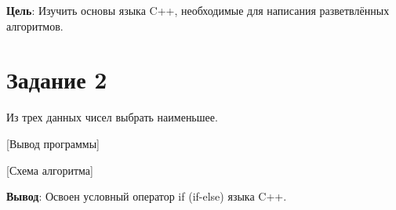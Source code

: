 \documentclass[variant=labwork]{bsuir}
\begin{document}
\textbf{Цель}: Изучить основы языка C++, необходимые для написания разветвлённых
алгоритмов.

\section*{Задание 2}

Из трех данных чисел выбрать наименьшее.


[Вывод программы]

[Схема алгоритма]

\textbf{Вывод}: Освоен условный оператор if (if-else) языка C++.
\end{document}
